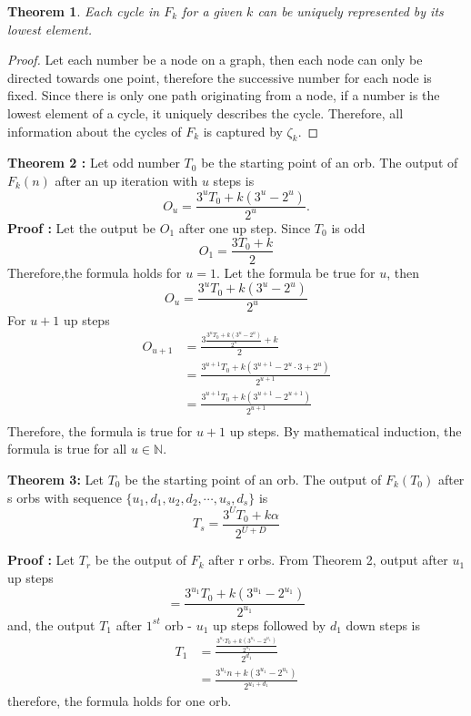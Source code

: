 \documentclass[12pt]{article} %
\newtheorem{theorem}{Theorem}[section]
\begin{document}
\begin{theorem}
Each cycle in $F_k$ for a given $k$ can be uniquely represented by its lowest element.
\end{theorem}
\begin{proof} 
Let each number be a node on a graph, then each node can only be directed towards one point, therefore the successive number for each node is fixed. Since there is only one path originating from a node, if a number is the lowest element of a cycle, it uniquely describes the cycle.
Therefore, all information about the cycles of $F_k$ is captured by $\zeta_k$.
\newline
\end{proof}
\textbf{Theorem 2 :} Let odd number $T_0$ be the starting point of an orb. The output of $F_k(n)$ after an up iteration with $u$ steps is 
\begin{equation*}
O_u = \frac{3^{u}T_0 +k(3^{u}-2^{u})}{2^{u}}.
\end{equation*}
\textbf{Proof :} Let the output be $O_1$ after one up step. Since $T_0$ is odd
\begin{equation*}
O_1 = \frac{3 T_0 + k}{2}
\end{equation*}
Therefore,the formula holds for $u=1$. Let the formula be true for $u$, then
\begin{equation*}
O_u=\frac{3^{u}T_0 +k(3^{u}-2^{u})}{2^{u}}
\end{equation*}
For $u+1$ up steps
\begin{align*}
O_{u+1} &=\frac{3\frac{3^{u}T_0 +k(3^{u}-2^{u})}{2^{u}}+k}{2}\\
&= \frac{3^{u+1}T_0 +k(3^{u+1}-2^{u}\cdot3+2^{u})}{2^{u+1}}\\
&=\frac{3^{u+1}T_0 +k(3^{u+1}-2^{u+1})}{2^{u+1}}\\
\end{align*}
Therefore, the formula is true for $u+1$ up steps. By mathematical induction, the formula is true for all $u \in \mathbb{N}$.
\newline

\textbf{Theorem 3:}
Let $T_0$ be the starting point of an orb. The output of $F_k(T_0)$ after s orbs with sequence $\{u_1, d_1, u_2, d_2, \cdots, u_s, d_s\}$ is
\begin{equation}
T_s = \frac{3^{U}T_0 + k\alpha}{2^{U+D}}
\label{eq:patheq}
\end{equation}

\textbf{Proof :}
Let $T_r$ be the output of $F_k$ after r orbs. From Theorem 2, output after $u_1$ up steps
\begin{equation*}
=\frac{3^{u_1}T_0 +k(3^{u_1}-2^{u_1})}{2^{u_1}}
\end{equation*}
and, the output $T_1$ after $1^{st}$ orb -  $u_1$ up steps followed by $d_1$ down steps is
\begin{align*}
T_1 & =\frac{\frac{3^{u_1}T_0 +k(3^{u_1}-2^{u_1})}{2^{u_1}}}{2^{d_1}}\\
    & =\frac{3^{u_1}n +k(3^{u_1}-2^{u_1})}{2^{u_1+d_1}}
\end{align*}
therefore, the formula holds for one orb.
\end{document}
